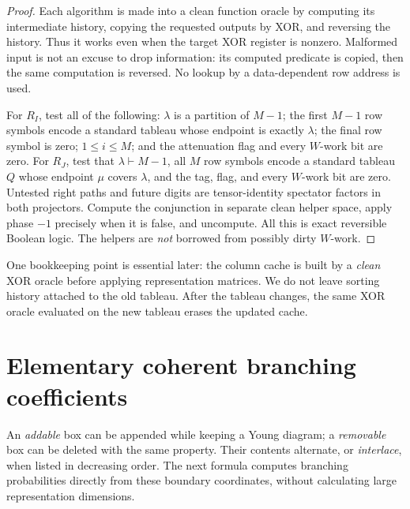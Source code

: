 \documentclass[11pt]{article}
\theoremstyle{definition}
\begin{document}
\begin{proof}
Each algorithm is made into a clean function oracle by computing its
intermediate history, copying the requested outputs by XOR, and reversing
the history. Thus it works even when the target XOR register is nonzero.
Malformed input is not an excuse to drop information: its computed
predicate is copied, then the same computation is reversed. No lookup by a
data-dependent row address is used.

For $R_I$, test all of the following: $\lambda$ is a partition of $M-1$;
the first $M-1$ row symbols encode a standard tableau whose endpoint is
exactly $\lambda$; the final row symbol is zero; $1\le i\le M$; and the
attenuation flag and every $W$-work bit are zero. For $R_J$, test that
$\lambda\vdash M-1$, all $M$ row symbols encode a standard tableau $Q$
whose endpoint $\mu$ covers $\lambda$, and the tag, flag, and every
$W$-work bit are zero. Untested right paths and future digits are
tensor-identity spectator factors in both projectors.
Compute the conjunction in
separate clean helper space, apply phase $-1$ precisely when it is false,
and uncompute. All this is exact reversible Boolean logic. The helpers
are \emph{not} borrowed from possibly dirty $W$-work.
\end{proof}

One bookkeeping point is essential later: the column cache is built by a
\emph{clean} XOR oracle before applying representation matrices. We do not
leave sorting history attached to the old tableau. After the tableau
changes, the same XOR oracle evaluated on the new tableau erases the
updated cache.

\section{Elementary coherent branching coefficients}\label{sec:weights}

An \emph{addable} box can be appended while keeping a Young diagram;
a \emph{removable} box can be deleted with the same property. Their
contents alternate, or \emph{interlace}, when listed in decreasing order.
The next formula computes branching probabilities directly from these
boundary coordinates, without calculating large representation dimensions.
\end{document}
